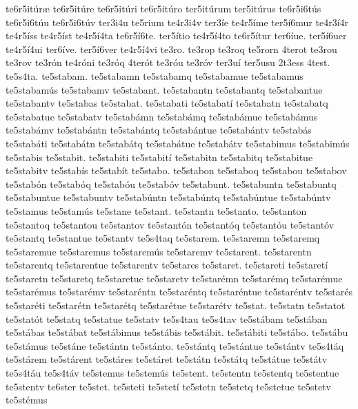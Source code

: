 {te6r5it^^far^^e6
te6r5it^^fare
te6r5it^^fari
te6r5it^^faro
ter5it^^farum
ter5it^^farus
te6r5i6t^^fas
te6r5i6t^^fau
te6r5i6t^^fav
ter3i4u
te5rium
te4r3i4v
ter3^^ede
te4r5^^edme
ter5^^ed6mur
te4r3^^ed4r
te4r5^^edss
te4r5^^edst
te4r5^^ed4ta
te6r5^^ed6te.
ter5^^edtio
te4r5^^ed4to
te6r5^^edtur
ter6^^edue.
ter5^^ed6uer
te4r5^^ed4ui
ter6^^edve.
ter5^^ed6ver
te4r5^^ed4vi
te3ro.
te3rop
te3roq
te5rorn
4terot
te3rou
te3rov
te3r^^f3n
te4r^^f3ni
te3r^^f3q
4ter^^f3t
te3r^^f3u
te3r^^f3v
ter3u^^ed
ter5usu
2t3ess
4test.
te5s4ta.
te5stabam.
te5stabamn
te5stabamq
te5stabamue
te5stabamus
te5stabam^^fas
te5stabamv
te5stabant.
te5stabantn
te5stabantq
te5stabantue
te5stabantv
te5stabas
te5stabat.
te5stabati
te5stabat^^ed
te5stabatn
te5stabatq
te5stabatue
te5stabatv
te5stab^^e1mn
te5stab^^e1mq
te5stab^^e1mue
te5stab^^e1mus
te5stab^^e1mv
te5stab^^e1ntn
te5stab^^e1ntq
te5stab^^e1ntue
te5stab^^e1ntv
te5stab^^e1s
te5stab^^e1ti
te5stab^^e1tn
te5stab^^e1tq
te5stab^^e1tue
te5stab^^e1tv
te5stabimus
te5stabim^^fas
te5stabis
te5stabit.
te5stabiti
te5stabit^^ed
te5stabitn
te5stabitq
te5stabitue
te5stabitv
te5stab^^eds
te5stab^^edt
te5stabo.
te5stabon
te5staboq
te5stabou
te5stabov
te5stab^^f3n
te5stab^^f3q
te5stab^^f3u
te5stab^^f3v
te5stabunt.
te5stabuntn
te5stabuntq
te5stabuntue
te5stabuntv
te5stab^^fantn
te5stab^^fantq
te5stab^^fantue
te5stab^^fantv
te5stamus
te5stam^^fas
te5stane
te5stant.
te5stantn
te5stanto.
te5stanton
te5stantoq
te5stantou
te5stantov
te5stant^^f3n
te5stant^^f3q
te5stant^^f3u
te5stant^^f3v
te5stantq
te5stantue
te5stantv
te5s4taq
te5starem.
te5staremn
te5staremq
te5staremue
te5staremus
te5starem^^fas
te5staremv
te5starent.
te5starentn
te5starentq
te5starentue
te5starentv
te5stares
te5staret.
te5stareti
te5staret^^ed
te5staretn
te5staretq
te5staretue
te5staretv
te5star^^e9mn
te5star^^e9mq
te5star^^e9mue
te5star^^e9mus
te5star^^e9mv
te5star^^e9ntn
te5star^^e9ntq
te5star^^e9ntue
te5star^^e9ntv
te5star^^e9s
te5star^^e9ti
te5star^^e9tn
te5star^^e9tq
te5star^^e9tue
te5star^^e9tv
te5stat.
te5statn
te5statot
te5stat^^f3t
te5statq
te5statue
te5statv
te5s4tau
te5s4tav
te5st^^e1bam
te5st^^e1ban
te5st^^e1bas
te5st^^e1bat
te5st^^e1bimus
te5st^^e1bis
te5st^^e1bit.
te5st^^e1biti
te5st^^e1bo.
te5st^^e1bu
te5st^^e1mus
te5st^^e1ne
te5st^^e1ntn
te5st^^e1nto.
te5st^^e1ntq
te5st^^e1ntue
te5st^^e1ntv
te5s4t^^e1q
te5st^^e1rem
te5st^^e1rent
te5st^^e1res
te5st^^e1ret
te5st^^e1tn
te5st^^e1tq
te5st^^e1tue
te5st^^e1tv
te5s4t^^e1u
te5s4t^^e1v
te5stemus
te5stem^^fas
te5stent.
te5stentn
te5stentq
te5stentue
te5stentv
te6ster
te5stet.
te5steti
te5stet^^ed
te5stetn
te5stetq
te5stetue
te5stetv
te5st^^e9mus
}
